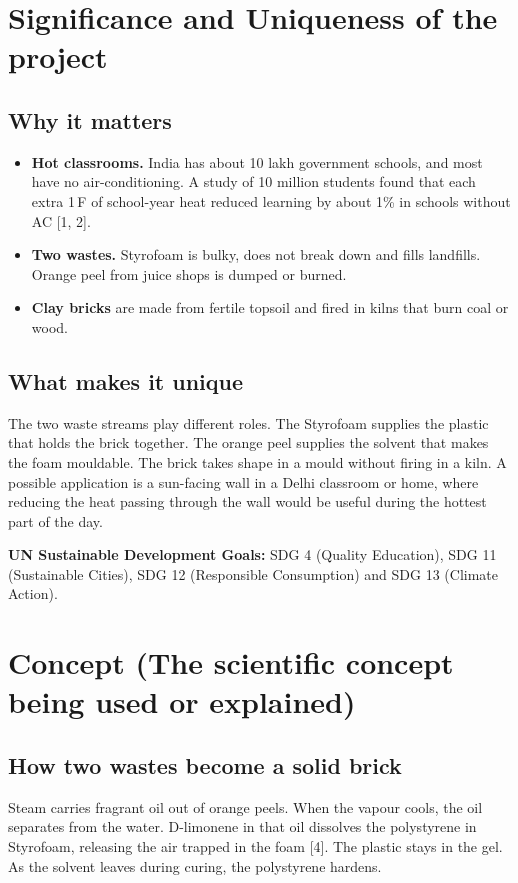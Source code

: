 \documentclass[11pt,a4paper]{article}
\begin{document}
\section{Significance and Uniqueness of the project}
\subsection{Why it matters}
\begin{itemize}[leftmargin=*,itemsep=2pt]
  \item \textbf{Hot classrooms.} India has about 10 lakh government schools,
        and most have no air-conditioning. A study of 10 million students
        found that each extra 1\,\textdegree F of school-year heat reduced learning by
        about 1\% in schools without AC [1, 2].
  \item \textbf{Two wastes.} Styrofoam is bulky, does not break down and fills
        landfills. Orange peel from juice shops is dumped or burned.
  \item \textbf{Clay bricks} are made from fertile topsoil and fired in kilns
        that burn coal or wood.
\end{itemize}

\subsection{What makes it unique}
The two waste streams play different roles. The Styrofoam supplies the
plastic that holds the brick together. The orange peel supplies the solvent
that makes the foam mouldable. The brick takes shape in a mould without firing
in a kiln. A possible application is a sun-facing wall in a Delhi classroom or
home, where reducing the heat passing through the wall would be useful during
the hottest part of the day.

\textbf{UN Sustainable Development Goals:} SDG 4 (Quality Education), SDG 11
(Sustainable Cities), SDG 12 (Responsible Consumption) and SDG 13 (Climate Action).

\section{Concept (The scientific concept being used or explained)}
\subsection{How two wastes become a solid brick}
Steam carries fragrant oil out of orange peels. When the vapour cools, the oil
separates from the water. D-limonene in that oil dissolves the polystyrene in
Styrofoam, releasing the air trapped in the foam [4]. The plastic stays in the
gel. As the solvent leaves during curing, the polystyrene hardens.
\end{document}
